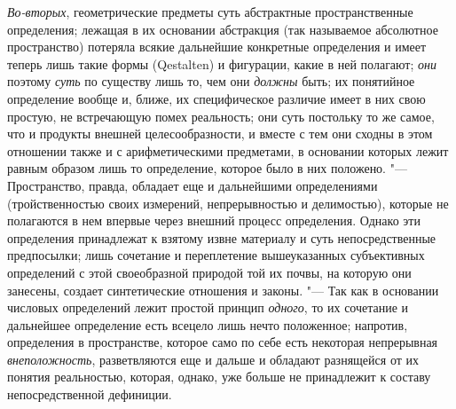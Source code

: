 {\em Во-вторых},
геометрические предметы суть абстрактные пространственные
определения; лежащая в их основании абстракция (так называемое абсолютное
пространство) потеряла всякие дальнейшие конкретные определения и имеет
теперь лишь такие формы (Qestalten) и фигурации, какие в ней
полагают; {\em они}
поэтому {\em суть}
по существу лишь то, чем они
{\em должны} быть; их
понятийное определение вообще и, ближе, их специфическое
различие имеет в них свою простую, не встречающую помех реальность; они
суть постольку то же самое, что и продукты внешней целесообразности, и
вместе с тем они сходны в этом отношении также и с арифметическими
предметами, в основании которых лежит равным образом лишь то определение,
которое было в них положено. "--- Пространство, правда,
обладает еще и дальнейшими определениями (тройственностью своих измерений,
непрерывностью и делимостью), которые не полагаются в нем впервые через
внешний процесс определения. Однако эти определения принадлежат к взятому
извне материалу и суть непосредственные предпосылки; лишь сочетание и
переплетение вышеуказанных субъективных определений с этой своеобразной
природой той их почвы, на которую они занесены, создает синтетические
отношения и законы. "--- Так как в основании числовых
определений лежит простой принцип
{\em одного}, то их
сочетание и дальнейшее определение есть всецело лишь нечто положенное;
напротив, определения в пространстве, которое само по себе есть некоторая
непрерывная {\em внеположность},
разветвляются еще и дальше и обладают разнящейся от их
понятия реальностью, которая, однако, уже больше не принадлежит к составу
непосредственной дефиниции.

